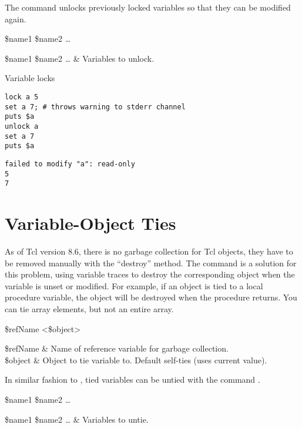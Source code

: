 \documentclass{article}
\begin{document}
The command  unlocks previously locked variables so that they can be modified again.
\begin{syntax}
 \$name1 \$name2 …
\end{syntax}
\begin{args}
\$name1 \$name2 … & Variables to unlock.
\end{args}

\begin{example}{Variable locks}
\begin{lstlisting}
lock a 5
set a 7; # throws warning to stderr channel
puts $a
unlock a
set a 7
puts $a
\end{lstlisting}
\tcblower
\begin{lstlisting}
failed to modify "a": read-only
5
7
\end{lstlisting}
\end{example}

\clearpage

\section{Variable-Object Ties}
As of Tcl version 8.6, there is no garbage collection for Tcl objects, they have to be removed manually with the ``destroy'' method. 
The command  is a solution for this problem, using variable traces to destroy the corresponding object when the variable is unset or modified. 
For example, if an object is tied to a local procedure variable, the object will be destroyed when the procedure returns.
You can tie array elements, but not an entire array.

\begin{syntax}
 \$refName <\$object>
\end{syntax}
\begin{args}
\$refName & Name of reference variable for garbage collection. \\
\$object & Object to tie variable to. Default self-ties (uses current value).
\end{args}

In similar fashion to , tied variables can be untied with the command .
\begin{syntax}
 \$name1 \$name2 …
\end{syntax}
\begin{args}
\$name1 \$name2 … & Variables to untie.
\end{args}
\end{document}
